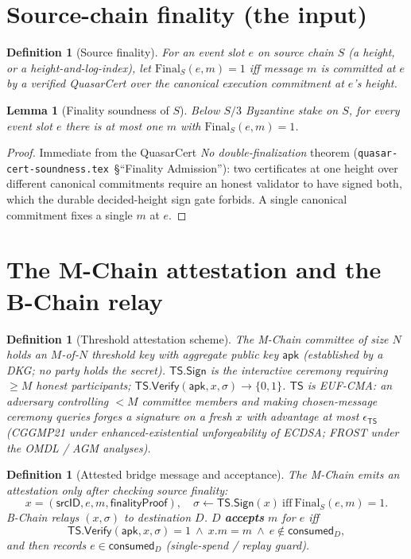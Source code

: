 \documentclass[11pt]{article}
\newtheorem{lemma}[theorem]{Lemma}
\newtheorem{definition}[theorem]{Definition}
\begin{document}
\section{Source-chain finality (the input)}
\label{sec:source}

\begin{definition}[Source finality]
\label{def:source-final}
For an event slot $e$ on source chain $S$ (a height, or a
height-and-log-index), let $\mathrm{Final}_S(e, m) = 1$ iff message $m$
is committed at $e$ by a verified QuasarCert over the canonical
execution commitment at $e$'s height.
\end{definition}

\begin{lemma}[Finality soundness of $S$]
\label{lem:source-sound}
Below $S/3$ Byzantine stake on $S$, for every event slot $e$ there is at
most one $m$ with $\mathrm{Final}_S(e,m)=1$.
\end{lemma}
\begin{proof}
Immediate from the QuasarCert \emph{No double-finalization} theorem
(\texttt{quasar-cert-soundness.tex}~\S``Finality Admission''): two
certificates at one height over different canonical commitments require
an honest validator to have signed both, which the durable
decided-height sign gate forbids. A single canonical commitment fixes a
single $m$ at $e$.
\end{proof}

\section{The M-Chain attestation and the B-Chain relay}
\label{sec:attest}

\begin{definition}[Threshold attestation scheme]
\label{def:ts}
The M-Chain committee of size $N$ holds an $M$-of-$N$ threshold key with
aggregate public key $\mathsf{apk}$ (established by a DKG; no party holds
the secret). $\mathsf{TS}.\mathsf{Sign}$ is the interactive ceremony
requiring $\ge M$ honest participants; $\mathsf{TS}.\mathsf{Verify}(
\mathsf{apk}, x, \sigma)\to\{0,1\}$. $\mathsf{TS}$ is EUF-CMA: an
adversary controlling $<M$ committee members and making chosen-message
ceremony queries forges a signature on a fresh $x$ with advantage at
most $\epsilon_{\mathsf{TS}}$ (CGGMP21 under enhanced-existential
unforgeability of ECDSA; FROST under the OMDL / AGM analyses).
\end{definition}

\begin{definition}[Attested bridge message and acceptance]
\label{def:accept}
The M-Chain emits an attestation only after checking source finality:
\[
  x = (\mathsf{srcID}, e, m, \mathsf{finalityProof}),\quad
  \sigma \leftarrow \mathsf{TS}.\mathsf{Sign}(x)
  \ \text{iff}\ \mathrm{Final}_S(e,m)=1 .
\]
B-Chain relays $(x,\sigma)$ to destination $D$. $D$ \textbf{accepts} $m$
for $e$ iff
\[
  \mathsf{TS}.\mathsf{Verify}(\mathsf{apk}, x, \sigma)=1
  \ \wedge\ x.m = m
  \ \wedge\ e \notin \mathsf{consumed}_D,
\]
and then records $e \in \mathsf{consumed}_D$ (single-spend / replay
guard).
\end{definition}
\end{document}
